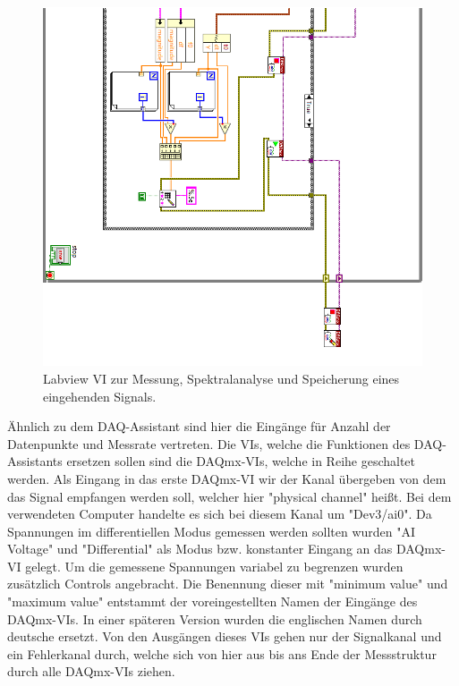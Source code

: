 		\begin{figure}[H]
			\centering
			\includegraphics[width=\textwidth]{pic/messstruktur2.png}	
			\caption{Labview VI zur Messung, Spektralanalyse und Speicherung eines eingehenden Signals.}
			\label{fig:messstruktur}
		\end{figure}
		
		\thispagestyle{empty}
		Ähnlich zu dem DAQ-Assistant sind hier die Eingänge für Anzahl der Datenpunkte und Messrate vertreten.
		Die VIs, welche die Funktionen des DAQ-Assistants ersetzen sollen sind die DAQmx-VIs, welche in Reihe geschaltet werden.
		Als Eingang in das erste DAQmx-VI wir der Kanal übergeben von dem das Signal empfangen werden soll, welcher hier "physical channel" heißt.
		Bei dem verwendeten Computer handelte es sich bei diesem Kanal um "Dev3/ai0".
		Da Spannungen im differentiellen Modus gemessen werden sollten wurden "AI Voltage" und "Differential" als Modus bzw. konstanter Eingang an das DAQmx-VI gelegt. 
		Um die gemessene Spannungen variabel zu begrenzen wurden zusätzlich Controls angebracht.
		Die Benennung dieser mit "minimum value" und "maximum value" entstammt der voreingestellten Namen der Eingänge des DAQmx-VIs.
		In einer späteren Version wurden die englischen Namen durch deutsche ersetzt.
		Von den Ausgängen dieses VIs gehen nur der Signalkanal und ein Fehlerkanal durch, welche sich von hier aus bis ans Ende der Messstruktur durch alle DAQmx-VIs ziehen.
		
